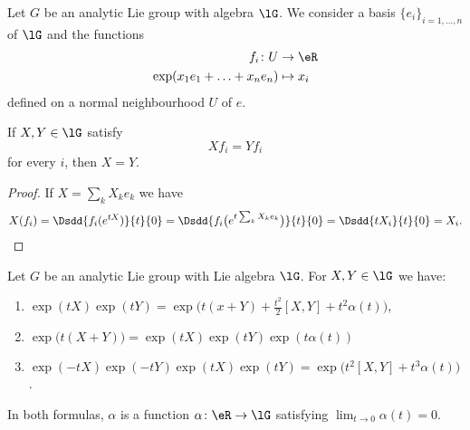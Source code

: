 \begin{lemma}       \label{LEMooWKFIooRHsrFX}
    Let \( G\) be an analytic Lie group with algebra \( \lG\). We consider a basis \( \{ e_i \}_{i=1,\ldots, n}\) of \( \lG\) and the functions
    \begin{equation}
        \begin{aligned}
            f_i\colon U&\to \eR \\
            \exp(x_1e_1+\ldots+x_ne_n)&\mapsto x_i 
        \end{aligned}
    \end{equation}
    defined on a normal neighbourhood \( U\) of \( e\).
    
    If \( X,Y\in \lG\) satisfy
    \begin{equation}
        Xf_i=Yf_i
    \end{equation}
    for every \( i\), then \( X=Y\).
\end{lemma}

\begin{proof}
    If \( X=\sum_kX_ke_k\) we have
    \begin{equation}
        X(f_i)=\Dsdd{ f_i( e^{tX}) }{t}{0}=\Dsdd{ f_i\big(  e^{t\sum_kX_ke_k} \big) }{t}{0}=\Dsdd{ tX_i }{t}{0}=X_i.
    \end{equation}
\end{proof}

\begin{lemma}
    Let \( G\) be an analytic Lie group with Lie algebra \( \lG\). For \( X,Y\in \lG\) we have:
    \begin{enumerate}
        \item       \label{ITEMooHVOIooKDrUSw}
            \( \exp(tX)\exp(tY)=\exp\big( t(x+Y)+\frac{ t^2 }{2}[X,Y]+t^2\alpha(t) \big)\),
        \item       \label{ITEMooWIQIooHphJcP}
            \( \exp\big( t(X+Y) \big)=\exp(tX)\exp(tY)\exp(t\alpha(t))\)
        \item       \label{ITEMooVMDCooExpIrp}
            \( \exp(-tX)\exp(-tY)\exp(tX)\exp(tY)=\exp\big( t^2[X,Y]+t^3\alpha(t) \big)\).
    \end{enumerate}
    In both formulas, \( \alpha\) is a function \( \alpha\colon \eR\to \lG\) satisfying \( \lim_{t\to 0} \alpha(t)=0\).
\end{lemma}

